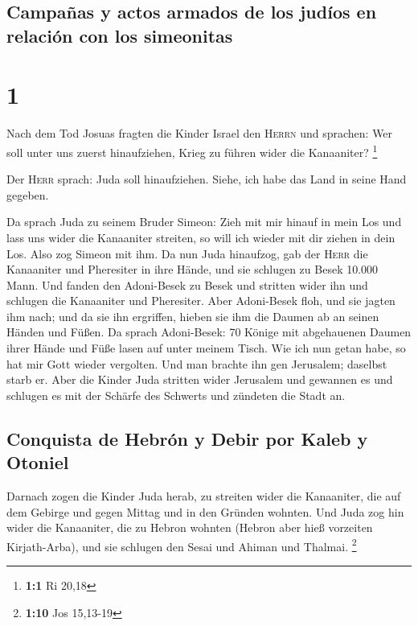 \hypertarget{campauxf1as-y-actos-armados-de-los-juduxedos-en-relaciuxf3n-con-los-simeonitas}{%
\subsection{Campañas y actos armados de los judíos en relación con los
simeonitas}\label{campauxf1as-y-actos-armados-de-los-juduxedos-en-relaciuxf3n-con-los-simeonitas}}

\hypertarget{section}{%
\section{1}\label{section}}

 Nach dem Tod Josuas fragten die Kinder Israel den
\textsc{Herrn} und sprachen: Wer soll unter uns zuerst hinaufziehen,
Krieg zu führen wider die Kanaaniter? \footnote{\textbf{1:1} Ri 20,18}

 Der \textsc{Herr} sprach: Juda soll hinaufziehen. Siehe,
ich habe das Land in seine Hand gegeben.

 Da sprach Juda zu seinem Bruder Simeon: Zieh mit mir
hinauf in mein Los und lass uns wider die Kanaaniter streiten, so will
ich wieder mit dir ziehen in dein Los. Also zog Simeon mit ihm.
 Da nun Juda hinaufzog, gab der \textsc{Herr} die
Kanaaniter und Pheresiter in ihre Hände, und sie schlugen zu Besek
10.000 Mann.  Und fanden den Adoni-Besek zu Besek und
stritten wider ihn und schlugen die Kanaaniter und Pheresiter.
 Aber Adoni-Besek floh, und sie jagten ihm nach; und da
sie ihn ergriffen, hieben sie ihm die Daumen ab an seinen Händen und
Füßen.  Da sprach Adoni-Besek: 70 Könige mit abgehauenen
Daumen ihrer Hände und Füße lasen auf unter meinem Tisch. Wie ich nun
getan habe, so hat mir Gott wieder vergolten. Und man brachte ihn gen
Jerusalem; daselbst starb er.  Aber die Kinder Juda
stritten wider Jerusalem und gewannen es und schlugen es mit der Schärfe
des Schwerts und zündeten die Stadt an.

\hypertarget{conquista-de-hebruxf3n-y-debir-por-kaleb-y-otoniel}{%
\subsection{Conquista de Hebrón y Debir por Kaleb y
Otoniel}\label{conquista-de-hebruxf3n-y-debir-por-kaleb-y-otoniel}}

 Darnach zogen die Kinder Juda herab, zu streiten wider
die Kanaaniter, die auf dem Gebirge und gegen Mittag und in den Gründen
wohnten.  Und Juda zog hin wider die Kanaaniter, die zu
Hebron wohnten (Hebron aber hieß vorzeiten Kirjath-Arba), und sie
schlugen den Sesai und Ahiman und Thalmai. \footnote{\textbf{1:10} Jos
  15,13-19}

